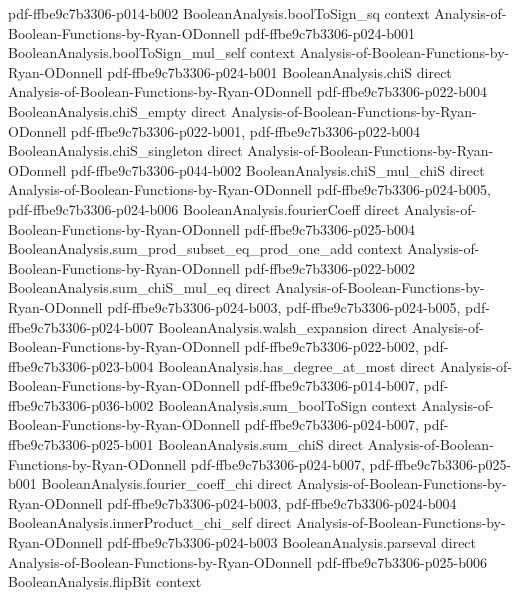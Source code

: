 \begin{lemma}
  {pdf-ffbe9c7b3306-p014-b002}
\proofstep
  {BooleanAnalysis.boolToSign_sq}
  {context}
  {Analysis-of-Boolean-Functions-by-Ryan-ODonnell}
  {pdf-ffbe9c7b3306-p024-b001}
\proofstep
  {BooleanAnalysis.boolToSign_mul_self}
  {context}
  {Analysis-of-Boolean-Functions-by-Ryan-ODonnell}
  {pdf-ffbe9c7b3306-p024-b001}
\proofstep
  {BooleanAnalysis.chiS}
  {direct}
  {Analysis-of-Boolean-Functions-by-Ryan-ODonnell}
  {pdf-ffbe9c7b3306-p022-b004}
\proofstep
  {BooleanAnalysis.chiS_empty}
  {direct}
  {Analysis-of-Boolean-Functions-by-Ryan-ODonnell}
  {pdf-ffbe9c7b3306-p022-b001,
    pdf-ffbe9c7b3306-p022-b004}
\proofstep
  {BooleanAnalysis.chiS_singleton}
  {direct}
  {Analysis-of-Boolean-Functions-by-Ryan-ODonnell}
  {pdf-ffbe9c7b3306-p044-b002}
\proofstep
  {BooleanAnalysis.chiS_mul_chiS}
  {direct}
  {Analysis-of-Boolean-Functions-by-Ryan-ODonnell}
  {pdf-ffbe9c7b3306-p024-b005,
    pdf-ffbe9c7b3306-p024-b006}
\proofstep
  {BooleanAnalysis.fourierCoeff}
  {direct}
  {Analysis-of-Boolean-Functions-by-Ryan-ODonnell}
  {pdf-ffbe9c7b3306-p025-b004}
\proofstep
  {BooleanAnalysis.sum_prod_subset_eq_prod_one_add}
  {context}
  {Analysis-of-Boolean-Functions-by-Ryan-ODonnell}
  {pdf-ffbe9c7b3306-p022-b002}
\proofstep
  {BooleanAnalysis.sum_chiS_mul_eq}
  {direct}
  {Analysis-of-Boolean-Functions-by-Ryan-ODonnell}
  {pdf-ffbe9c7b3306-p024-b003,
    pdf-ffbe9c7b3306-p024-b005,
    pdf-ffbe9c7b3306-p024-b007}
\proofstep
  {BooleanAnalysis.walsh_expansion}
  {direct}
  {Analysis-of-Boolean-Functions-by-Ryan-ODonnell}
  {pdf-ffbe9c7b3306-p022-b002,
    pdf-ffbe9c7b3306-p023-b004}
\proofstep
  {BooleanAnalysis.has_degree_at_most}
  {direct}
  {Analysis-of-Boolean-Functions-by-Ryan-ODonnell}
  {pdf-ffbe9c7b3306-p014-b007,
    pdf-ffbe9c7b3306-p036-b002}
\proofstep
  {BooleanAnalysis.sum_boolToSign}
  {context}
  {Analysis-of-Boolean-Functions-by-Ryan-ODonnell}
  {pdf-ffbe9c7b3306-p024-b007,
    pdf-ffbe9c7b3306-p025-b001}
\proofstep
  {BooleanAnalysis.sum_chiS}
  {direct}
  {Analysis-of-Boolean-Functions-by-Ryan-ODonnell}
  {pdf-ffbe9c7b3306-p024-b007,
    pdf-ffbe9c7b3306-p025-b001}
\proofstep
  {BooleanAnalysis.fourier_coeff_chi}
  {direct}
  {Analysis-of-Boolean-Functions-by-Ryan-ODonnell}
  {pdf-ffbe9c7b3306-p024-b003,
    pdf-ffbe9c7b3306-p024-b004}
\proofstep
  {BooleanAnalysis.innerProduct_chi_self}
  {direct}
  {Analysis-of-Boolean-Functions-by-Ryan-ODonnell}
  {pdf-ffbe9c7b3306-p024-b003}
\proofstep
  {BooleanAnalysis.parseval}
  {direct}
  {Analysis-of-Boolean-Functions-by-Ryan-ODonnell}
  {pdf-ffbe9c7b3306-p025-b006}
\proofstep
  {BooleanAnalysis.flipBit}
  {context}

\end{lemma}

